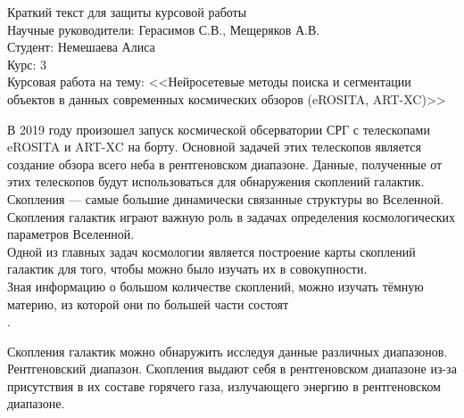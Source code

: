 \documentclass{article}
\begin{document}
Краткий текст для защиты курсовой работы\\
Научные руководители: Герасимов С.В., Мещеряков А.В.\\
Студент: Немешаева Алиса\\
Курс: 3\\

Курсовая работа на тему:  <<Нейросетевые методы поиска и сегментации объектов в данных современных 
космических обзоров (eROSITA, ART-XC)>>

В 2019 году произошел запуск космической обсерватории СРГ с телескопами 
eROSITA и ART-XC на борту. Основной задачей этих телескопов является создание обзора всего неба в 
рентгеновском диапазоне. Данные, полученные от этих телескопов будут использоваться для обнаружения 
скоплений галактик.\\


Скопления ---  самые большие динамически связанные структуры во Вселенной. 
Скопления галактик играют важную роль в задачах определения космологических параметров Вселенной.\\

Одной из главных задач космологии является построение карты скоплений галактик для того, чтобы 
можно было изучать их в совокупности.\\

Зная информацию о большом количестве скоплений, можно изучать тёмную материю, из которой они по 
большей части состоят \\. 


Скопления галактик можно обнаружить исследуя данные различных диапазонов.\\

Рентгеновский диапазон. Скопления выдают себя в рентгеновском 
диапазоне из-за присутствия в их составе горячего газа, излучающего энергию в рентгеновском 
диапазоне. \\
\end{document}

